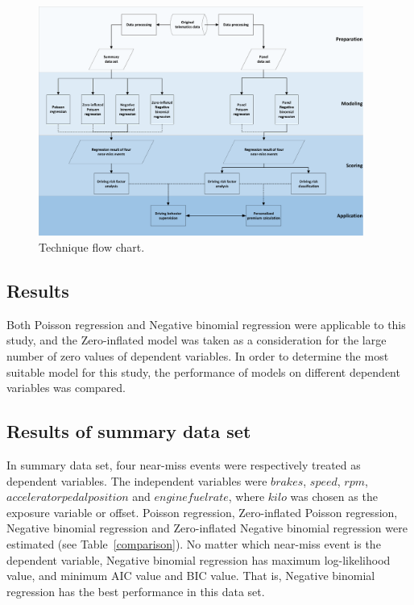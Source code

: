 \documentclass[entropy,article,submit,moreauthors,LaTeX and dvi2pdf]{Definitions/mdpi}
\begin{document}
\begin{figure}[htbp]
\widefigure
\includegraphics[width=0.95\textwidth]{Figure/Flow chat.pdf}
\caption{Technique flow chart.}
\label{flow}
\end{figure}
\begin{paracol}{2}
\linenumbers
\switchcolumn
\section{Results}
Both Poisson regression and Negative binomial regression were applicable to this study, and the Zero-inflated model was taken as a consideration for the large number of zero values of dependent variables.
In order to determine the most suitable model for this study, the performance of models on different dependent variables was compared.
\subsection{Results of summary data set}
In summary data set, four near-miss events were respectively treated as dependent variables. The independent variables were $brakes$, $speed$, $rpm$, $acceleratorpedalposition$ and $enginefuelrate$, where $kilo$ was chosen as the exposure variable or offset. Poisson regression, Zero-inflated Poisson regression, Negative binomial regression and Zero-inflated Negative binomial regression were estimated (see Table~\ref{comparison}). No matter which near-miss event is the dependent variable, Negative binomial regression has maximum log-likelihood value, and minimum AIC value and BIC value. That is, Negative binomial regression has the best performance in this data set.
\end{paracol}
\end{document}
